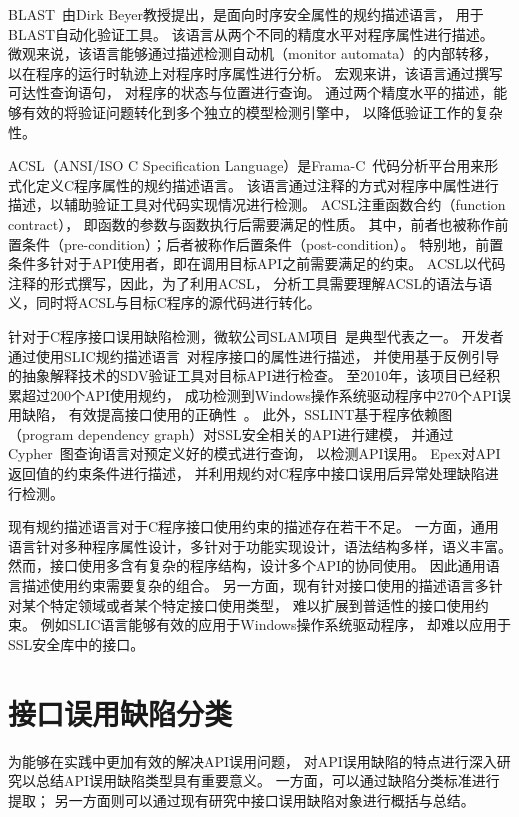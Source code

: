BLAST~\cite{blast}由Dirk Beyer教授提出，是面向时序安全属性的规约描述语言，
用于BLAST自动化验证工具。
该语言从两个不同的精度水平对程序属性进行描述。
微观来说，该语言能够通过描述检测自动机（monitor automata）的内部转移，
以在程序的运行时轨迹上对程序时序属性进行分析。
宏观来讲，该语言通过撰写可达性查询语句，
对程序的状态与位置进行查询。
通过两个精度水平的描述，能够有效的将验证问题转化到多个独立的模型检测引擎中，
以降低验证工作的复杂性。

ACSL（ANSI/ISO C Specification Language）是Frama-C~\cite{16-rv-framac}代码分析平台用来形式化定义C程序属性的规约描述语言。
该语言通过注释的方式对程序中属性进行描述，以辅助验证工具对代码实现情况进行检测。
ACSL注重函数合约（function contract），
即函数的参数与函数执行后需要满足的性质。
其中，前者也被称作前置条件（pre-condition）；后者被称作后置条件（post-condition）。
特别地，前置条件多针对于API使用者，即在调用目标API之前需要满足的约束。
ACSL以代码注释的形式撰写，因此，为了利用ACSL，
分析工具需要理解ACSL的语法与语义，同时将ACSL与目标C程序的源代码进行转化。


针对于C程序接口误用缺陷检测，微软公司SLAM项目~\cite{slam}是典型代表之一。
开发者通过使用SLIC规约描述语言~\cite{01-slic}对程序接口的属性进行描述，
并使用基于反例引导的抽象解释技术的SDV验证工具对目标API进行检查。
至2010年，该项目已经积累超过200个API使用规约，
成功检测到Windows操作系统驱动程序中270个API误用缺陷，
有效提高接口使用的正确性~\cite{10-cad-slam, 11-acm-slam}。
此外，SSLINT基于程序依赖图（program dependency graph）对SSL安全相关的API进行建模，
并通过Cypher~\cite{18-sigmod-cypher}图查询语言对预定义好的模式进行查询，
以检测API误用。
Epex对API返回值的约束条件进行描述，
并利用规约对C程序中接口误用后异常处理缺陷进行检测。

现有规约描述语言对于C程序接口使用约束的描述存在若干不足。
一方面，通用语言针对多种程序属性设计，多针对于功能实现设计，语法结构多样，语义丰富。
然而，接口使用多含有复杂的程序结构，设计多个API的协同使用。
因此通用语言描述使用约束需要复杂的组合。
另一方面，现有针对接口使用的描述语言多针对某个特定领域或者某个特定接口使用类型，
难以扩展到普适性的接口使用约束。
例如SLIC语言能够有效的应用于Windows操作系统驱动程序，
却难以应用于SSL安全库中的接口。


\section{接口误用缺陷分类}
\label{sec:2.3}
为能够在实践中更加有效的解决API误用问题，
对API误用缺陷的特点进行深入研究以总结API误用缺陷类型具有重要意义。
一方面，可以通过缺陷分类标准进行提取；
另一方面则可以通过现有研究中接口误用缺陷对象进行概括与总结。

